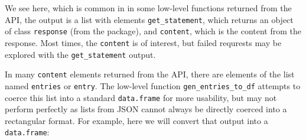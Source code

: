 We see here, which is common in in some low-level functions returned
from the API, the output is a list with elements
\texttt{get\_statement}, which returns an object of class
\texttt{response} (from the  package), and \texttt{content},
which is the content from the response. Most times, the \texttt{content}
is of interest, but failed requrests may be explored with the
\texttt{get\_statement} output.

In many \texttt{content} elements returned from the API, there are
elements of the list named \texttt{entries} or \texttt{entry}. The
low-level function \texttt{gen\_entries\_to\_df} attempts to coerce this
list into a standard \texttt{data.frame} for more usability, but may not
perform perfectly as lists from JSON cannot always be directly coerced
into a rectangular format. For example, here we will convert that output
into a \texttt{data.frame}:

